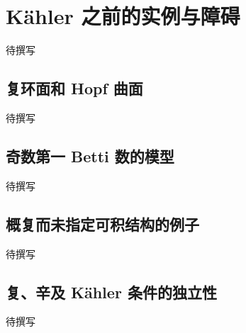 
% 
% 
% 

\section{Kähler 之前的实例与障碍}
\label{g4:sec:1504}

待撰写

\subsection{复环面和 Hopf 曲面}
\label{g4:subsec:1504:01}
待撰写

\subsection{奇数第一 Betti 数的模型}
\label{g4:subsec:1504:02}
待撰写

\subsection{概复而未指定可积结构的例子}
\label{g4:subsec:1504:03}
待撰写

\subsection{复、辛及 Kähler 条件的独立性}
\label{g4:subsec:1504:04}
待撰写
